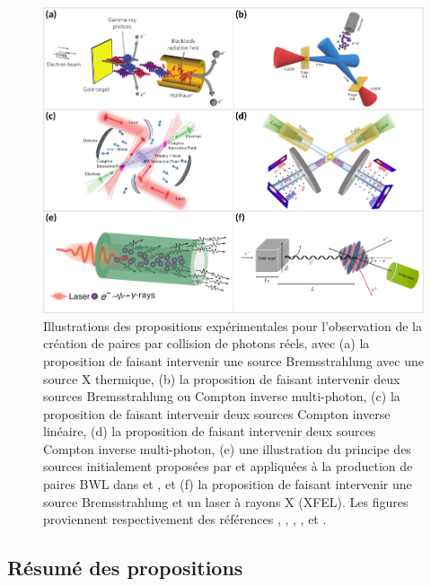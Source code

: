 \begin{refsection}
\begin{figure}[hbtp]
	\centering
	\includegraphics[width=\linewidth]{3-experience/experiences_BWL.png}
	\caption{Illustrations des propositions expérimentales pour l'observation de la création de paires par collision de photons réels, avec (a) la proposition de \cite{pike_2014} faisant intervenir une source Bremsstrahlung avec une source X thermique, (b) la proposition de \cite{ribeyre_2016} faisant intervenir deux sources Bremsstrahlung ou Compton inverse multi-photon, (c) la proposition de \cite{drebot_2017} faisant intervenir deux sources Compton inverse linéaire, (d) la proposition de \cite{yu_2019} faisant intervenir deux sources Compton inverse multi-photon, (e) une illustration du principe des sources initialement proposées par \cite{stark_2016} et appliquées à la production de paires BWL dans \cite{jansen_2018a} et \cite{wang_2020}, et (f) la proposition de \cite{golub_2020} faisant intervenir une source Bremsstrahlung et un laser à rayons X (XFEL). Les figures proviennent respectivement des références \parencite{pike_2014}, \parencite{ribeyre_2016}, \parencite{drebot_2017a}, \parencite{yu_2019}, \parencite{wang_2020} et \parencite{golub_2020}.}
	\label{fig:3-propositions_BWL}
\end{figure}

\subsection{Résumé des propositions}


\end{refsection}
